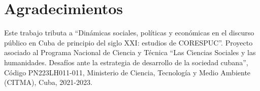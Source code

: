 \documentclass[a4paper,11pt,twocolumn,twoside]{article}
\begin{document}
\section*{Agradecimientos}

Este trabajo tributa a ``Dinámicas sociales, políticas y económicas en el discurso público 
en Cuba de principio del siglo XXI: estudios de CORESPUC''. Proyecto 
asociado al Programa Nacional de Ciencia y Técnica ``Las Ciencias Sociales y las humanidades. 
Desafíos ante la estrategia de desarrollo de la sociedad cubana'', Código PN223LH011-011, Ministerio
de Ciencia, Tecnología y Medio Ambiente (CITMA), Cuba, 2021-2023.



\end{document}
